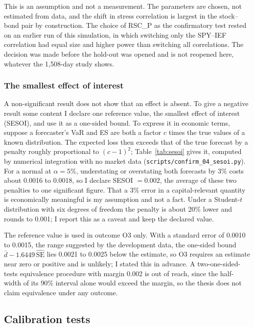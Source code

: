 This is an assumption and not a measurement. The parameters are chosen, not estimated from data, and the shift in stress correlation is largest in the stock--bond pair by construction. The choice of RSC\_P as the confirmatory test rested on an earlier run of this simulation, in which switching only the SPY--IEF correlation had equal size and higher power than switching all correlations. The decision was made before the hold-out was opened and is not reopened here, whatever the 1,508-day study shows.

\subsubsection{The smallest effect of interest}\label{sec:sesoi}

A non-significant result does not show that an effect is absent. To give a negative result some content I declare one reference value, the smallest effect of interest (SESOI), and use it as a one-sided bound. To express it in economic terms, suppose a forecaster's VaR and ES are both a factor $c$ times the true values of a known distribution. The expected loss then exceeds that of the true forecast by a penalty roughly proportional to $(c-1)^2$; Table~\ref{tab:sesoi} gives it, computed by numerical integration with no market data (\texttt{scripts/confirm\_04\_sesoi.py}). For a normal at $\alpha=5\%$, understating or overstating both forecasts by 3\% costs about 0.0016 to 0.0018, so I declare SESOI $=0.002$, the average of these two penalties to one significant figure. That a 3\% error in a capital-relevant quantity is economically meaningful is my assumption and not a fact. Under a Student-$t$ distribution with six degrees of freedom the penalty is about 20\% lower and rounds to 0.001; I report this as a caveat and keep the declared value.



The reference value is used in outcome O3 only. With a standard error of 0.0010 to 0.0015, the range suggested by the development data, the one-sided bound $\bar d-1.6449\,\widehat{\mathrm{SE}}$ lies 0.0021 to 0.0025 below the estimate, so O3 requires an estimate near zero or positive and is unlikely; I stated this in advance. A two-one-sided-tests equivalence procedure with margin 0.002 is out of reach, since the half-width of its 90\% interval alone would exceed the margin, so the thesis does not claim equivalence under any outcome.

\subsection{Calibration tests}\label{sec:calibration}

